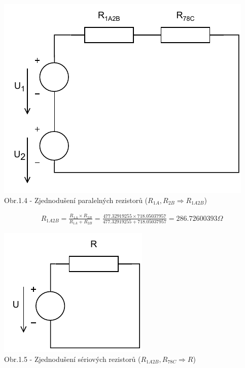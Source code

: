 \begin{center}
\includegraphics[scale=0.8,keepaspectratio]{fig/solutions/01-sol/01-step4.pdf} \\
Obr.1.4 - Zjednodušení paralelných rezistorů
($R_{1A}, R_{2B} \Rightarrow R_{1A2B}$)
\end{center}

\begin{gather*}
    R_{1A2B} = \frac{R_{1A} \times R_{2B}}{R_{1A} + R_{2B}} =
    \frac{477.32919255 \times 718.05037957}{477.32919255 + 718.05037957} =
    286.72600393 \Omega
\end{gather*}

\begin{center}
\includegraphics[scale=0.8,keepaspectratio]{fig/solutions/01-sol/01-step5.pdf} \\
Obr.1.5 - Zjednodušení sériových rezistorů
($R_{1A2B}, R_{78C} \Rightarrow R$)
\end{center}

